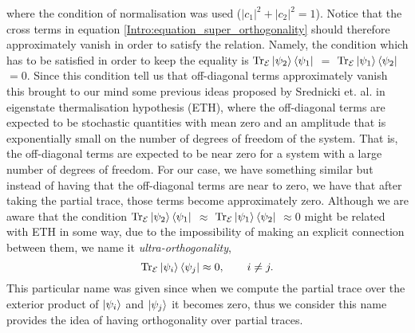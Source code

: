 where the condition of normalisation was used ($|c_1|^2 + |c_2|^2 =1$). Notice that the cross terms in equation \eqref{Intro:equation_super_orthogonality} should therefore approximately vanish in order to satisfy the relation. Namely, the condition which has to be satisfied in order to keep the equality is $\operatorname{Tr}_{\mathcal{E}}\mathinner{|{\psi_2}\rangle}\mathinner{\langle{\psi_1}|}$ $=$ $\operatorname{Tr}_{\mathcal{E}}\mathinner{|{\psi_1}\rangle}\mathinner{\langle{\psi_2}|}$ $=0$. Since this condition tell us that off-diagonal terms approximately vanish this brought to our mind some previous ideas proposed by Srednicki et. al.\cite{srednicki_chaos_1994,deutsch_quantum_1991,rigol_alternatives_2012} in eigenstate thermalisation hypothesis (ETH), where the off-diagonal terms are expected to be stochastic quantities with mean zero and an amplitude that is exponentially small on the number of degrees of freedom of the system. That is, the off-diagonal terms are expected to be near zero for a system with a large number of degrees of freedom. For our case, we have something similar but instead of having that the off-diagonal terms are near to zero, we have that after taking the partial trace, those terms become approximately zero. Although we are aware that the condition $\operatorname{Tr}_{\mathcal{E}}\mathinner{|{\psi_2}\rangle}\mathinner{\langle{\psi_1}|}$ $\approx$ $\operatorname{Tr}_{\mathcal{E}}\mathinner{|{\psi_1}\rangle}\mathinner{\langle{\psi_2}|}$ $\approx 0$ might be related with ETH in some way, due to the impossibility of making an explicit connection between them, we name it \textit{ultra-orthogonality},
\begin{equation}
\operatorname{Tr}_{\mathcal{E}}\mathinner{|{\psi_i}\rangle}\mathinner{\langle{\psi_j}|} \approx 0,\quad \quad i\neq j.
\label{Intro:Condition_ultraorthogonality}
\end{equation}
This particular name was given since when we compute the partial trace over the exterior product of $\mathinner{|{\psi_i}\rangle}$ and $\mathinner{|{\psi_j}\rangle}$ it becomes zero, thus we consider this name provides the idea of having orthogonality over partial traces.\\

